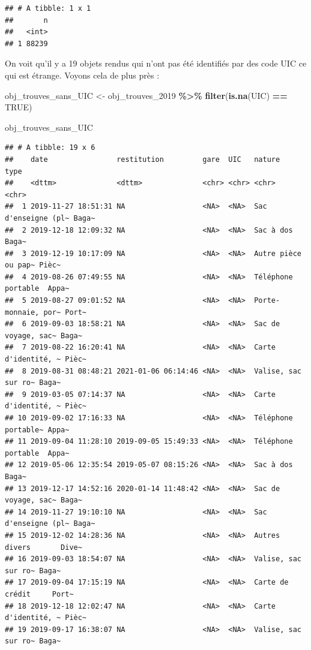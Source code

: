 \documentclass[
]{article}
\newenvironment{Shaded}{\begin{snugshade}}{\end{snugshade}}
\newcommand{\ConstantTok}[1]{\textcolor[rgb]{0.56,0.35,0.01}{#1}}
\newcommand{\FunctionTok}[1]{\textcolor[rgb]{0.13,0.29,0.53}{\textbf{#1}}}
\newcommand{\NormalTok}[1]{#1}
\newcommand{\OtherTok}[1]{\textcolor[rgb]{0.56,0.35,0.01}{#1}}
\newcommand{\SpecialCharTok}[1]{\textcolor[rgb]{0.81,0.36,0.00}{\textbf{#1}}}
\begin{document}
\begin{verbatim}
## # A tibble: 1 x 1
##       n
##   <int>
## 1 88239
\end{verbatim}

On voit qu'il y a 19 objets rendus qui n'ont pas été identifiés par des
code UIC ce qui est étrange. Voyons cela de plus près :

\begin{Shaded}
\begin{Highlighting}[]
\NormalTok{obj\_trouves\_sans\_UIC }\OtherTok{\textless{}{-}}\NormalTok{ obj\_trouves\_2019 }\SpecialCharTok{\%\textgreater{}\%}
  \FunctionTok{filter}\NormalTok{(}\FunctionTok{is.na}\NormalTok{(UIC) }\SpecialCharTok{==} \ConstantTok{TRUE}\NormalTok{)}

\NormalTok{obj\_trouves\_sans\_UIC}
\end{Highlighting}
\end{Shaded}

\begin{verbatim}
## # A tibble: 19 x 6
##    date                restitution         gare  UIC   nature              type 
##    <dttm>              <dttm>              <chr> <chr> <chr>               <chr>
##  1 2019-11-27 18:51:31 NA                  <NA>  <NA>  Sac d'enseigne (pl~ Baga~
##  2 2019-12-18 12:09:32 NA                  <NA>  <NA>  Sac à dos           Baga~
##  3 2019-12-19 10:17:09 NA                  <NA>  <NA>  Autre pièce ou pap~ Pièc~
##  4 2019-08-26 07:49:55 NA                  <NA>  <NA>  Téléphone portable  Appa~
##  5 2019-08-27 09:01:52 NA                  <NA>  <NA>  Porte-monnaie, por~ Port~
##  6 2019-09-03 18:58:21 NA                  <NA>  <NA>  Sac de voyage, sac~ Baga~
##  7 2019-08-22 16:20:41 NA                  <NA>  <NA>  Carte d'identité, ~ Pièc~
##  8 2019-08-31 08:48:21 2021-01-06 06:14:46 <NA>  <NA>  Valise, sac sur ro~ Baga~
##  9 2019-03-05 07:14:37 NA                  <NA>  <NA>  Carte d'identité, ~ Pièc~
## 10 2019-09-02 17:16:33 NA                  <NA>  <NA>  Téléphone portable~ Appa~
## 11 2019-09-04 11:28:10 2019-09-05 15:49:33 <NA>  <NA>  Téléphone portable  Appa~
## 12 2019-05-06 12:35:54 2019-05-07 08:15:26 <NA>  <NA>  Sac à dos           Baga~
## 13 2019-12-17 14:52:16 2020-01-14 11:48:42 <NA>  <NA>  Sac de voyage, sac~ Baga~
## 14 2019-11-27 19:10:10 NA                  <NA>  <NA>  Sac d'enseigne (pl~ Baga~
## 15 2019-12-02 14:28:36 NA                  <NA>  <NA>  Autres divers       Dive~
## 16 2019-09-03 18:54:07 NA                  <NA>  <NA>  Valise, sac sur ro~ Baga~
## 17 2019-09-04 17:15:19 NA                  <NA>  <NA>  Carte de crédit     Port~
## 18 2019-12-18 12:02:47 NA                  <NA>  <NA>  Carte d'identité, ~ Pièc~
## 19 2019-09-17 16:38:07 NA                  <NA>  <NA>  Valise, sac sur ro~ Baga~
\end{verbatim}
\end{document}
